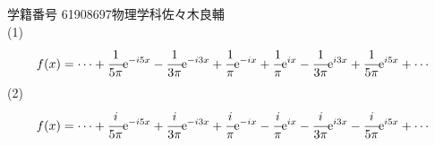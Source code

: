 \documentclass[uplatex,a4j,11pt]{jsarticle}
\begin{document}
学籍番号 61908697\qquad 物理学科\qquad 佐々木良輔\\
(1)\\
\begin{align}
  f(x)=\cdots+\cfrac{1}{5\pi}{\rm e}^{-i5x}-\cfrac{1}{3\pi}{\rm e}^{-i3x}+\cfrac{1}{\pi}{\rm e}^{-ix}+
  \cfrac{1}{\pi}{\rm e}^{ix}-\cfrac{1}{3\pi}{\rm e}^{i3x}+\cfrac{1}{5\pi}{\rm e}^{i5x}+\cdots
\end{align}
(2)\\
\begin{align}
  f(x)=\cdots+\cfrac{i}{5\pi}{\rm e}^{-i5x}+\cfrac{i}{3\pi}{\rm e}^{-i3x}+\cfrac{i}{\pi}{\rm e}^{-ix}-
  \cfrac{i}{\pi}{\rm e}^{ix}-\cfrac{i}{3\pi}{\rm e}^{i3x}-\cfrac{i}{5\pi}{\rm e}^{i5x}+\cdots
\end{align}
\end{document}
